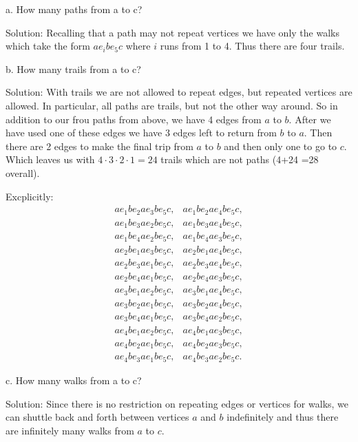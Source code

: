 \documentclass[16 pt]{amsart}
\theoremstyle{definition}
\theoremstyle{remark}
\numberwithin{equation}{subsection}
\newcommand{\trail}[3]{a e_{#1} b e_{#2} a e_{#3} b e_5 c }
\begin{document}
a. How many paths from a to c?

\vspace{.5in}

Solution: Recalling that a path may not repeat vertices we have only the walks which take the form $a e_{i} b e_5 c$ where $i$ runs from 1 to 4.  Thus there are four trails.

\vspace{.5in}

b. How many trails from a to c? 

\vspace{.5in}

Solution: With trails we are not allowed to repeat edges, but repeated vertices are allowed.  In particular, all paths are trails, but not the other way around.  So in addition to our frou paths from above, we have 4 edges from $a$ to $b$.  After we have used one of these edges we have 3 edges left to return from $b$ to $a$.  Then there are 2 edges to make the final trip from $a$ to $b$ and then only one to go to $c$.  Which leaves us with $4\cdot 3\cdot 2\cdot 1= 24$ trails which are not paths (4+24 =28 overall).

Excplicitly:
\begin{eqnarray*}
\trail{1}{2}{3}, & \trail{1}{2}{4},\\
\trail{1}{3}{2}, & \trail{1}{3}{4},\\
\trail{1}{4}{2}, & \trail{1}{4}{3},\\
\trail{2}{1}{3}, & \trail{2}{1}{4},\\
\trail{2}{3}{1}, & \trail{2}{3}{4},\\
\trail{2}{4}{1}, & \trail{2}{4}{3},\\
\trail{3}{1}{2}, & \trail{3}{1}{4},\\
\trail{3}{2}{1}, & \trail{3}{2}{4},\\
\trail{3}{4}{1}, & \trail{3}{4}{2},\\
\trail{4}{1}{2}, & \trail{4}{1}{3},\\
\trail{4}{2}{1}, & \trail{4}{2}{3},\\
\trail{4}{3}{1}, & \trail{4}{3}{2}.
\end{eqnarray*}


\vspace{.5in}

c. How many walks from a to c?

\vspace{.5in}

Solution: Since there is no restriction on repeating edges or vertices for walks, we can shuttle back and forth between vertices $a$ and $b$ indefinitely and thus there are infinitely many walks from $a$ to $c$.
\end{document}
